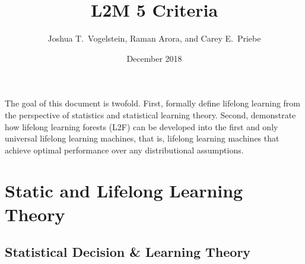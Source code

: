 \documentclass{article}
\title{L2M 5 Criteria}
\author{Joshua T.~Vogelstein, Raman Arora, and Carey E.~Priebe}
\affil{Johns Hopkins University}
\date{December 2018}
\begin{document}
\maketitle

The goal of this document is twofold. First, formally define lifelong learning from the perspective of statistics and statistical learning theory.  Second, demonstrate how lifelong learning forests (L2F) can be developed into the first and only universal lifelong learning machines, that is, lifelong learning machines that achieve optimal performance over any distributional assumptions.  

\tableofcontents

\clearpage
\setcounter{section}{-1}
\section{Static and Lifelong Learning Theory}
\subsection{Statistical Decision \& Learning Theory}
\end{document}
